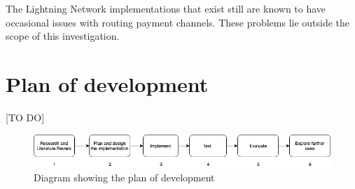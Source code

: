 The Lightning	Network implementations that exist still are known to have occasional issues with routing payment channels. These problems lie outside the scope of this investigation.


\section{Plan of development}

[TO DO]

\begin{figure}[h]
\centering
\includegraphics[scale=0.5]{Figures/plan_of_development.jpg}
\caption{Diagram showing the plan of development}
\label{fig:plan_of_development}
\end{figure}
